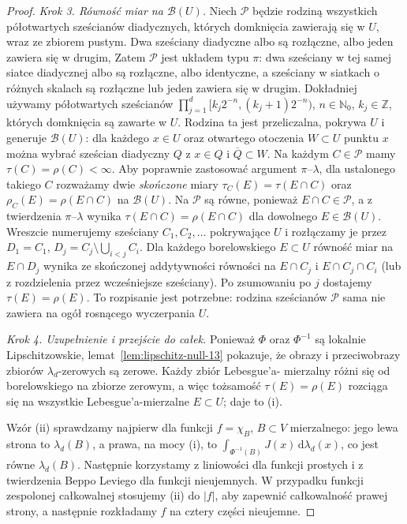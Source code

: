 \begin{proof}
\emph{Krok 3. Równość miar na $\mathcal B(U)$.}
Niech $\mathcal P$ będzie rodziną wszystkich półotwartych
sześcianów diadycznych, których domknięcia zawierają się
w $U$, wraz ze zbiorem pustym. Dwa sześciany diadyczne
albo są rozłączne, albo jeden zawiera się w drugim,
Zatem $\mathcal P$ jest układem typu $\pi$:
dwa sześciany w tej samej siatce diadycznej albo są
rozłączne, albo identyczne, a sześciany w siatkach
o różnych skalach są rozłączne lub jeden zawiera się
w drugim. Dokładniej używamy półotwartych sześcianów
$\prod_{j=1}^d[k_j2^{-n},(k_j+1)2^{-n})$,
$n\in\mathbb N_0$, $k_j\in\mathbb Z$, których domknięcia
są zawarte w $U$. Rodzina ta jest przeliczalna,
pokrywa $U$ i generuje
$\mathcal B(U)$: dla każdego $x\in U$ oraz otwartego
otoczenia $W\subset U$ punktu $x$ można wybrać
sześcian diadyczny $Q$ z $x\in Q$ i $\overline Q\subset W$.
Na każdym $C\in\mathcal P$ mamy
$\tau(C)=\rho(C)<\infty$. Aby poprawnie zastosować
argument $\pi$--$\lambda$, dla ustalonego takiego $C$
rozważamy dwie \emph{skończone} miary
$\tau_C(E)=\tau(E\cap C)$ oraz
$\rho_C(E)=\rho(E\cap C)$ na $\mathcal B(U)$.
Na $\mathcal P$ są równe, ponieważ $E\cap C\in\mathcal P$,
a z twierdzenia $\pi$--$\lambda$ wynika
$\tau(E\cap C)=\rho(E\cap C)$ dla dowolnego
$E\in\mathcal B(U)$. Wreszcie numerujemy sześciany
$C_1,C_2,\dots$ pokrywające $U$ i rozłączamy je przez
$D_1=C_1$, $D_j=C_j\setminus\bigcup_{i<j}C_i$.
Dla każdego borelowskiego $E\subset U$ równość miar
na $E\cap D_j$ wynika ze skończonej addytywności
równości na $E\cap C_j$ i $E\cap C_j\cap C_i$
(lub z rozdzielenia przez wcześniejsze sześciany).
Po zsumowaniu po $j$ dostajemy
$\tau(E)=\rho(E)$. To rozpisanie jest potrzebne:
rodzina sześcianów $\mathcal P$ sama nie zawiera
na ogół rosnącego wyczerpania $U$.

\emph{Krok 4. Uzupełnienie i przejście do całek.}
Ponieważ $\Phi$ oraz $\Phi^{-1}$ są lokalnie
Lipschitzowskie, lemat~\ref{lem:lipschitz-null-13}
pokazuje, że obrazy i przeciwobrazy zbiorów
$\lambda_d$-zerowych są zerowe. Każdy zbiór Lebesgue'a-
mierzalny różni się od borelowskiego na zbiorze zerowym,
a więc tożsamość $\tau(E)=\rho(E)$ rozciąga się na
wszystkie Lebesgue'a-mierzalne $E\subset U$; daje to (i).

Wzór (ii) sprawdzamy najpierw dla funkcji $f=\chi_B$,
$B\subset V$ mierzalnego: jego lewa strona to
$\lambda_d(B)$, a prawa, na mocy (i), to
$\int_{\Phi^{-1}(B)}J(x)\,\mathrm d\lambda_d(x)$,
co jest równe $\lambda_d(B)$.
Następnie korzystamy z liniowości dla funkcji prostych
i z twierdzenia Beppo Leviego dla funkcji nieujemnych.
W przypadku funkcji zespolonej całkowalnej stosujemy
(ii) do $|f|$, aby zapewnić całkowalność prawej strony,
a następnie rozkładamy $f$ na cztery części nieujemne.
\end{proof}

